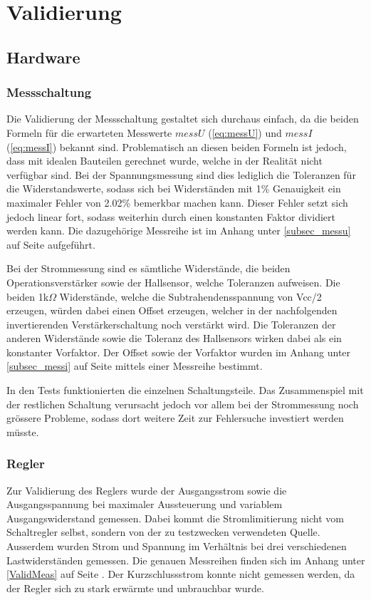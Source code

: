 \section{Validierung}

\subsection{Hardware}

\subsubsection{Messschaltung}
Die Validierung der Messschaltung gestaltet sich durchaus einfach, da die beiden Formeln für die erwarteten Messwerte $messU$ (\ref{eq:messU}) und $messI$ (\ref{eq:messI}) bekannt sind. Problematisch an diesen beiden Formeln ist jedoch, dass mit idealen Bauteilen gerechnet wurde, welche in der Realität nicht verfügbar sind. Bei der Spannungsmessung sind dies lediglich die Toleranzen für die Widerstandswerte, sodass sich bei Widerständen mit 1\% Genauigkeit ein maximaler Fehler von 2.02\% bemerkbar machen kann. Dieser Fehler setzt sich jedoch linear fort, sodass weiterhin durch einen konstanten Faktor dividiert werden kann. Die dazugehörige Messreihe ist im Anhang unter \ref{subsec_messu} auf Seite \pageref{subsec_messu} aufgeführt.

Bei der Strommessung sind es sämtliche Widerstände, die beiden Operationsverstärker sowie der Hallsensor, welche Toleranzen aufweisen. Die beiden 1k$\Omega$ Widerstände, welche die Subtrahendensspannung von Vcc/2 erzeugen, würden dabei einen Offset erzeugen, welcher in der nachfolgenden invertierenden Verstärkerschaltung noch verstärkt wird. Die Toleranzen der anderen Widerstände sowie die Toleranz des Hallsensors wirken dabei als ein konstanter Vorfaktor. Der Offset sowie der Vorfaktor wurden im Anhang unter \ref{subsec_messi} auf Seite \pageref{subsec_messi} mittels einer Messreihe bestimmt.

In den Tests funktionierten die einzelnen Schaltungsteile. Das Zusammenspiel mit der restlichen Schaltung verursacht jedoch vor allem bei der Strommessung noch grössere Probleme, sodass dort weitere Zeit zur Fehlersuche investiert werden müsste.

\subsubsection{Regler}\label{subsec:ValRegler}

Zur Validierung des Reglers wurde der Ausgangsstrom sowie die Ausgangsspannung bei maximaler Aussteuerung und variablem Ausgangswiderstand gemessen. Dabei kommt die Stromlimitierung nicht vom Schaltregler selbst, sondern von der zu testzwecken verwendeten Quelle. Ausserdem wurden Strom und Spannung im Verhältnis bei drei verschiedenen Lastwiderständen gemessen. Die genauen Messreihen finden sich im Anhang unter \ref{ValidMeas} auf Seite \pageref{ValidMeas}. Der Kurzschlussstrom konnte nicht gemessen werden, da der Regler sich zu stark erwärmte und unbrauchbar wurde.

